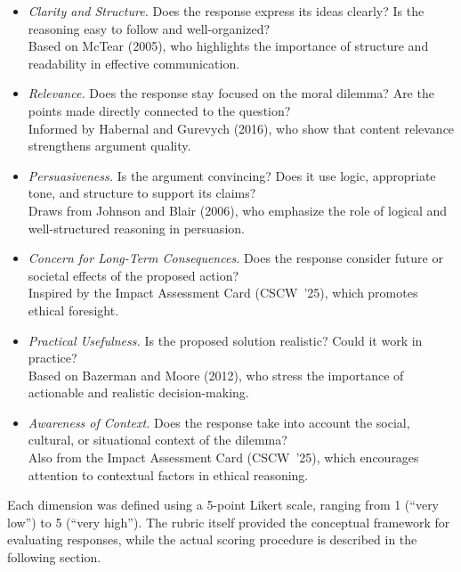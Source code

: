 \begin{itemize}
\item \textit{Clarity and Structure.} Does the response express its ideas clearly? Is the reasoning easy to follow and well-organized?\\
\hspace*{0.5em}Based on McTear (2005), who highlights the importance of structure and readability in effective communication.

\item \textit{Relevance.} Does the response stay focused on the moral dilemma? Are the points made directly connected to the question?\\
\hspace*{0.5em}Informed by Habernal and Gurevych (2016), who show that content relevance strengthens argument quality.

\item \textit{Persuasiveness.} Is the argument convincing? Does it use logic, appropriate tone, and structure to support its claims?\\
\hspace*{0.5em}Draws from Johnson and Blair (2006), who emphasize the role of logical and well-structured reasoning in persuasion.

\item \textit{Concern for Long-Term Consequences.} Does the response consider future or societal effects of the proposed action?\\
\hspace*{0.5em}Inspired by the Impact Assessment Card (CSCW~'25), which promotes ethical foresight.

\item \textit{Practical Usefulness.} Is the proposed solution realistic? Could it work in practice?\\
\hspace*{0.5em}Based on Bazerman and Moore (2012), who stress the importance of actionable and realistic decision-making.

\item \textit{Awareness of Context.} Does the response take into account the social, cultural, or situational context of the dilemma?\\
\hspace*{0.5em}Also from the Impact Assessment Card (CSCW~'25), which encourages attention to contextual factors in ethical reasoning.
\end{itemize}

Each dimension was defined using a 5-point Likert scale, ranging from 1 (``very low'') to 5 (``very high''). The rubric itself provided the conceptual framework for evaluating responses, while the actual scoring procedure is described in the following section.


